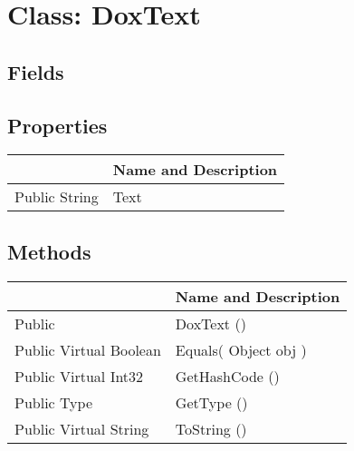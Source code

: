 \documentclass[11pt, oneside, a4paper]{book}
\begin{document}
\hypertarget{SoftwareEngineeringTools.{}Documentation.{}DoxText}{}
\section{Class: DoxText}

\subsection{Fields}

\subsection{Properties}
\begin{center}
\begin{tabular}{| p{3cm} | p{12cm} | }
\hline
\textbf{ } & \textbf{ Name and Description}\\
\hline
 Public  String &  Text\hypertarget{SoftwareEngineeringTools.{}Documentation.{}DoxText.{}Text}{}\\
\hline
\end{tabular}
\end{center}

\subsection{Methods}
\begin{center}
\begin{tabular}{| p{3cm} | p{12cm} | }
\hline
\textbf{ } & \textbf{ Name and Description}\\
\hline
 Public  &  DoxText ()\hypertarget{SoftwareEngineeringTools.{}Documentation.{}DoxText.{}DoxText}{}\\
\hline
 Public  Virtual  Boolean &  Equals(\hypertarget{SoftwareEngineeringTools.{}Documentation.{}DoxText.{}Equals\_Object}{} Object  obj  )\\
\hline
 Public  Virtual  Int32 &  GetHashCode ()\hypertarget{SoftwareEngineeringTools.{}Documentation.{}DoxText.{}GetHashCode}{}\\
\hline
 Public  Type &  GetType ()\hypertarget{SoftwareEngineeringTools.{}Documentation.{}DoxText.{}GetType}{}\\
\hline
 Public  Virtual  String &  ToString ()\hypertarget{SoftwareEngineeringTools.{}Documentation.{}DoxText.{}ToString}{}\\
\hline
\end{tabular}
\end{center}
 
\end{document}
